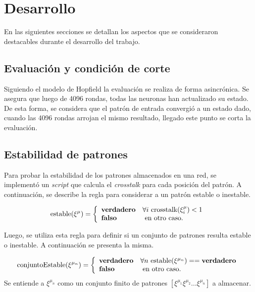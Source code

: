 \documentclass{article}
\begin{document}
\section{Desarrollo}
En las siguientes secciones se detallan los aspectos que se consideraron destacables durante el desarrollo del trabajo.

\subsection{Evaluación y condición de corte}

Siguiendo el modelo de Hopfield la evaluación se realiza de forma asincrónica. Se asegura que luego de 4096 rondas,
todas las neuronas han actualizado su estado. De esta forma, se considera que el patrón de entrada convergió a un estado dado,
cuando las 4096 rondas arrojan el mismo resultado, llegado este punto se corta la evaluación.

\subsection{Estabilidad de patrones}
Para probar la estabilidad de los patrones almacenados en una red, se implementó un \emph{script} que calcula el \emph{crosstalk}
para cada posición del patrón. A continuación, se describe la regla para considerar a un patrón estable o inestable.


\begin{equation}
 \mbox{estable}(\xi^\mu) = \left\{ \begin{array}{ll}
 \mbox{\textbf{verdadero}} & \forall i \mbox{ crosstalk}(\xi^\mu_i) < 1 \\
  \mbox{\textbf{falso}} &\mbox{ en otro caso.}
       \end{array} \right.
\end{equation}

Luego, se utiliza esta regla para definir si un conjunto de patrones resulta estable o inestable. A continuación se presenta la misma.

\begin{equation}
 \mbox{conjuntoEstable}(\xi^{\mu_n}) = \left\{ \begin{array}{ll}
 \mbox{\textbf{verdadero}} & \forall n \mbox{ estable}(\xi^{\mu_n}) == \mbox{\textbf{verdadero}} \\
  \mbox{\textbf{falso}} &\mbox{ en otro caso.}
       \end{array} \right.
\end{equation}
Se entiende a $\xi^{\mu_n}$ como un conjunto finito de patrones $[\xi^{\mu_1} \xi^{\mu_2} \dots \xi^{\mu_n}]$ a almacenar.\\
\end{document}
